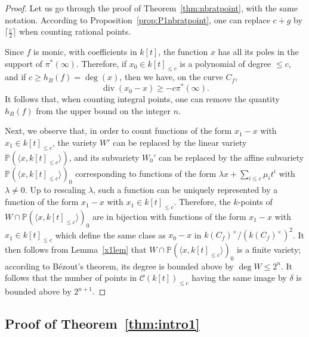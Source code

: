 \documentclass[11pt]{article}
\theoremstyle{plain}
\theoremstyle{definition}
\DeclareMathOperator{\divisor}{div}
\begin{document}
\begin{proof}
Let us go through the proof of Theorem~\ref{thm:nbratpoint}, with the same notation. According to Proposition~\ref{prop:P1nbratpoint}, one can replace $c+g$ by $\lceil\frac{c}{2}\rceil$ when counting rational points.

Since $f$ is monic, with coefficients in $k[t]$, the function $x$ has all its poles in the support of $\pi^*(\infty)$. Therefore, if $x_0 \in k[t]_{\leq c}$ is a polynomial of degree $\leq c$, and if $c\geq h_B(f)=\deg(x)$, then we have, on the curve $C_f$,
$$
\divisor(x_0-x) \geq -c\pi^*(\infty).
$$
It follows that, when counting integral points, one can remove the quantity $h_B(f)$ from the upper bound on the integer $n$.

Next, we observe that, in order to count functions of the form $x_1-x$ with $x_1\in k[t]_{\leq c}$, the variety $W'$ can be replaced by the linear variety $\mathbb{P}(\langle x, k[t]_{\leq c}\rangle)$, and its subvariety $W_0'$ can be replaced by the affine subvariety $\mathbb{P}(\langle x, k[t]_{\leq c}\rangle)_0$ corresponding to functions of the form $\lambda x +\sum_{i\leq c} \mu_it^i$ with $\lambda\neq 0$.
Up to rescaling $\lambda$, such a function can be uniquely represented by a function of the form $x_1-x$ with $x_1\in k[t]_{\leq c}$. Therefore, the $k$-points of $W\cap \mathbb{P}(\langle x, k[t]_{\leq c}\rangle)_0$ are in bijection with functions of the form $x_1-x$ with $x_1\in k[t]_{\leq c}$ which define the same class as $x_0-x$ in $k(C_f)^\times/(k(C_f)^\times)^2$. It then follows from Lemma~\ref{x1lem} that $W\cap \mathbb{P}(\langle x, k[t]_{\leq c}\rangle)_0$ is a finite variety; according to B{\'e}zout's theorem, its degree is bounded above by $\deg W\leq 2^n$. It follows that the number of points in $\mathcal{C}(k[t])_{\leq c}$  having the same image by $\delta$ is bounded above by $2^{n+1}$.
\end{proof}



\subsection{Proof of Theorem~\ref{thm:intro1}}
\label{sec:intro1proof}
\end{document}
